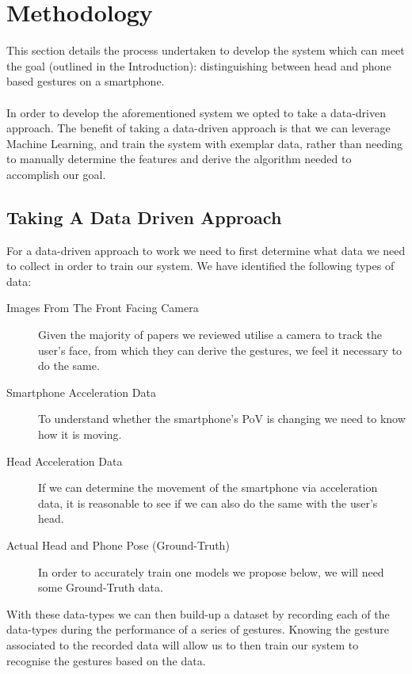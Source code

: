 \section{Methodology} %


This section details the process undertaken to develop the system which can meet the goal (outlined in the Introduction): distinguishing between head and phone based gestures on a smartphone.
\\\\
In order to develop the aforementioned system we opted to take a data-driven approach. The benefit of taking a data-driven approach is that we can leverage Machine Learning, and train the system with exemplar data, rather than needing to manually determine the features and derive the algorithm needed to accomplish our goal.

\subsection{Taking A Data Driven Approach}
For a data-driven approach to work we need to first determine what data we need to collect in order to train our system. We have identified the following types of data:
\begin{description}
    \item[Images From The Front Facing Camera]\nl Given the majority of papers we reviewed  utilise a camera to track the user's face, from which they can derive the gestures, we feel it necessary to do the same.
    \item[Smartphone Acceleration Data]\nl To understand whether the smartphone's PoV is changing we need to know how it is moving. 
    \item[Head Acceleration Data]\nl If we can determine the movement of the smartphone via acceleration data, it is reasonable to see if we can also do the same with the user's head.
    \item[Actual Head and Phone Pose (Ground-Truth)]\nl In order to accurately train one models we propose below, we will need some Ground-Truth data.
\end{description}

With these data-types we can then build-up a dataset by recording each of the data-types during the performance of a series of gestures. Knowing the gesture associated to the recorded data will allow us to then train our system to recognise the gestures based on the data.

